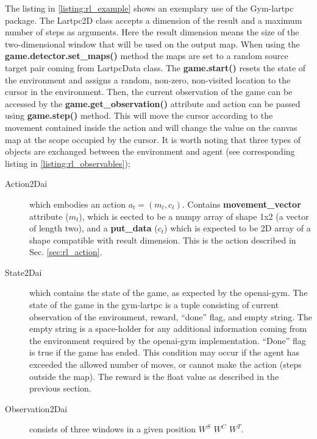\begin{sloppypar}
The listing in \ref{listing:rl_example} shows an exemplary use of the Gym-lartpc package.
The Lartpc2D class accepts a dimension of the result and a maximum number of steps as arguments.
Here the result dimension means the size of the two-dimensional window that will be used on the output map.
When using the \textbf{game.detector.set\_maps()} method the maps are set to a random source target pair coming from LartpcData class.
The \textbf{game.start()} resets the state of the environment and assigns a random, non-zero, non-visited location to the cursor in the environment.
Then, the current observation of the game can be accessed by the \textbf{game.get\_observation()} attribute and action can be passed using \textbf{game.step()} method. This will move the cursor according to the movement contained inside the action and will change the value on the canvas map at the scope occupied by the cursor.
It is worth noting that three types of objects are exchanged between the environment and agent (see corresponding listing in \ref{listing:rl_observables});
\end{sloppypar}

\begin{description}
\item[Action2Dai] which embodies an action $a_{t} = (m_{t}, c_{t})$. Contains \textbf{movement\_vector} attribute ($m_t$), which is eected to be a numpy array of shape 1x2 (a vector of length two), and a \textbf{put\_data} ($c_t$) which is expected to be 2D array of a shape compatible with result dimension. This is the action described in Sec. \ref{sec:rl_action}.

\item[State2Dai] which contains the state of the game, as expected by the openai-gym. The state of the game in the gym-lartpc is a tuple consisting of current observation of the environment, reward, ``done'' flag, and empty string.
The empty string is a space-holder for any additional information coming from the environment required by the openai-gym implementation. ``Done'' flag is true if the game has ended.
This condition may occur if the agent has exceeded the allowed number of moves, or cannot make the action (steps outside the map).
The reward is the float value as described in the previous section.

\item[Observation2Dai] consists of three windows in a given position $W^{S}$ $W^{C}$ $W^{T}$.
\end{description}

